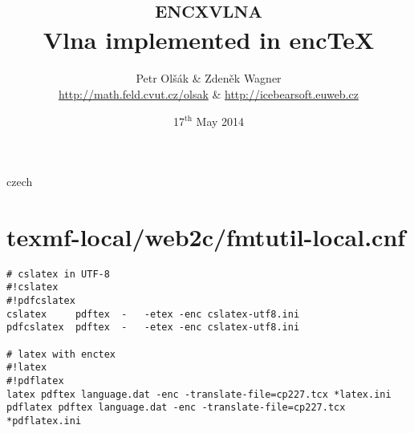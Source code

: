 \documentclass[12pt,a4paper]{article}
\def\sup#1{\ensuremath{^\mathrm{#1}}}
\newif\ifeng
\begin{document}
\title{\textsc{encxvlna}\\Vlna implemented in enc\TeX}
\author{Petr Olšák \& Zdeněk Wagner\\\url{http://math.feld.cvut.cz/olsak} \&
\url{http://icebearsoft.euweb.cz}}
\date{17\sup{th} May 2014}
\maketitle
\def\contentsname{Contents\,/\,Obsah}
\tableofcontents

\engtrue

\clearpage

\begin{otherlanguage*}{czech}
\engfalse
\end{otherlanguage*}

\section{texmf-local/web2c/fmtutil-local.cnf}\label{fmtutil}
\begingroup\footnotesize
\begin{verbatim}
# cslatex in UTF-8
#!cslatex
#!pdfcslatex
cslatex		pdftex	-	-etex -enc cslatex-utf8.ini
pdfcslatex	pdftex	-	-etex -enc cslatex-utf8.ini

# latex with enctex
#!latex
#!pdflatex
latex pdftex language.dat -enc -translate-file=cp227.tcx *latex.ini
pdflatex pdftex language.dat -enc -translate-file=cp227.tcx *pdflatex.ini
\end{verbatim}
\endgroup
\end{document}
